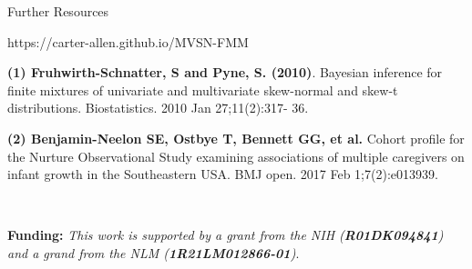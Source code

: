 \documentclass[final]{beamer}
\newlength{\onecolwid}
\begin{document}
\begin{frame}[t]
\begin{columns}[t]
\begin{column}{\onecolwid}
\begin{alertblock}{Further Resources}

\centering
https://carter-allen.github.io/MVSN-FMM

\end{alertblock}

\tiny  \textbf{(1) Fruhwirth-Schnatter, S and Pyne, S. (2010)}. Bayesian inference for finite mixtures of univariate and multivariate skew-normal and skew-t distributions. Biostatistics. 2010 Jan 27;11(2):317- 36.

\textbf{(2) Benjamin-Neelon SE, Ostbye T, Bennett GG, et al.} Cohort profile for the Nurture Observational Study examining associations of multiple caregivers on infant growth in the Southeastern USA. BMJ open. 2017 Feb 1;7(2):e013939.

\

\tiny \textbf{Funding:} \textit{This work is supported by a grant from the NIH (\textbf{R01DK094841}) and a grand from the NLM (\textbf{1R21LM012866-01})}.





\end{column} %

\end{columns} %

\end{frame} %
\end{document}
